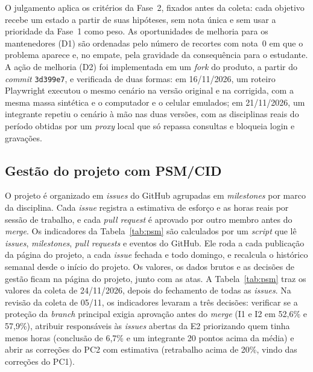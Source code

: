 \documentclass[12pt]{article}
\begin{document}
O julgamento aplica os critérios da Fase~2, fixados antes da coleta: cada
objetivo recebe um estado a partir de suas hipóteses, sem nota única e sem usar
a prioridade da Fase~1 como peso. As oportunidades de melhoria para os
mantenedores (D1) são ordenadas pelo número de recortes com nota~0 em que o
problema aparece e, no empate, pela gravidade da consequência para o estudante.
A ação de melhoria (D2) foi implementada em um \textit{fork} do produto, a partir
do \textit{commit} \texttt{3d399e7}, e verificada de duas formas: em 16/11/2026,
um roteiro Playwright executou o mesmo cenário na versão original e na corrigida,
com a mesma massa sintética e o computador e o celular emulados; em 21/11/2026,
um integrante repetiu o cenário à mão nas duas versões, com as disciplinas reais
do período obtidas por um \textit{proxy} local que só repassa consultas e bloqueia
login e gravações.

\subsection{Gestão do projeto com PSM/CID}\label{subsec:psm}

O projeto é organizado em \textit{issues} do GitHub agrupadas em
\textit{milestones} por marco da disciplina. Cada \textit{issue} registra a
estimativa de esforço e as horas reais por sessão de trabalho, e cada
\textit{pull request} é aprovado por outro membro antes do \textit{merge}. Os
indicadores da Tabela~\ref{tab:psm} são calculados por um \textit{script} que lê
\textit{issues}, \textit{milestones}, \textit{pull requests} e eventos do
GitHub. Ele roda a cada publicação da página do projeto, a cada \textit{issue}
fechada e todo domingo, e recalcula o histórico semanal desde o início do
projeto. Os valores, os dados brutos e as decisões de gestão ficam na página do
projeto, junto com as atas. A Tabela~\ref{tab:psm} traz os valores da coleta de
24/11/2026, depois do fechamento de todas as \textit{issues}. Na revisão da coleta de 05/11, os indicadores levaram a três decisões:
verificar se a proteção da \textit{branch} principal exigia aprovação antes do
\textit{merge} (I1 e I2 em 52,6\% e 57,9\%), atribuir responsáveis às
\textit{issues} abertas da E2 priorizando quem tinha menos horas (conclusão de
6,7\% e um integrante 20 pontos acima da média) e abrir as correções do PC2 com
estimativa (retrabalho acima de 20\%, vindo das correções do PC1).
\end{document}
